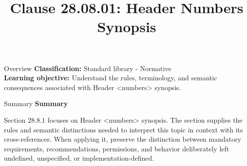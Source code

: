 \documentclass[10pt,letterpaper]{article}
\title{Clause 28.08.01: Header Numbers Synopsis}
\author{}
\date{}
\begin{document}
\maketitle
\begin{CornellOverviewBox}{Overview}
\textbf{Classification:} Standard library - Normative\\[2pt]
\textbf{Learning objective:} Understand the rules, terminology, and semantic consequences associated with Header <numbers> synopsis.
\end{CornellOverviewBox}\begin{CornellSummaryBox}{Summary}
{\sffamily\bfseries\color{Accent} Summary}\par\vspace{3pt}Section 28.8.1 focuses on Header <numbers> synopsis. The section supplies the rules and semantic distinctions needed to interpret this topic in context with its cross-references. When applying it, preserve the distinction between mandatory requirements, recommendations, permissions, and behavior deliberately left undefined, unspecified, or implementation-defined.
\end{CornellSummaryBox}
\end{document}

